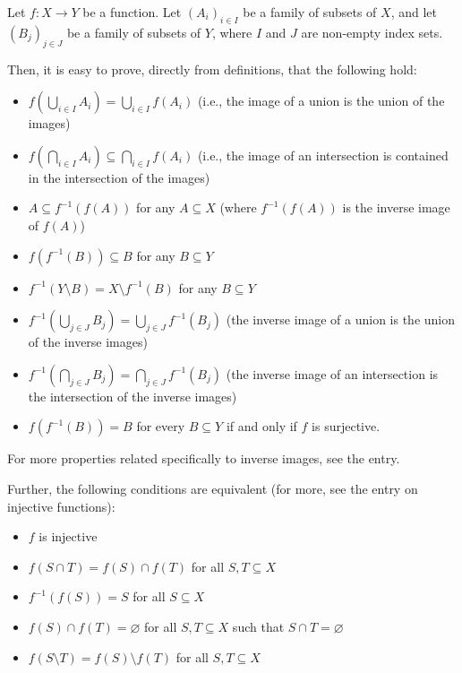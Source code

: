 \documentclass[12pt]{article}
\def\emptyset{\varnothing}
\begin{document}
Let $f \colon X \to Y$ be a function.
Let $(A_i)_{i \in I}$ be a family of subsets of $X$,
and let $(B_j)_{j \in J}$ be a family of subsets of $Y$,
where $I$ and $J$ are non-empty index sets.

Then, it is easy to prove, directly from definitions, that the following hold:

\begin{itemize}
\item $f(\bigcup \limits_{i \in I}{A_i}) = \bigcup \limits_{i \in I}{f(A_i)}$ (i.e., the image of a union is the union of the images)
\item $f(\bigcap \limits_{i \in I}{A_i}) \subseteq \bigcap \limits_{i \in I}{f(A_i)}$ (i.e., the image of an intersection is contained in the intersection of the images)
\item $A \subseteq f^{-1}(f(A))$ for any $A \subseteq X$ (where $f^{-1}(f(A))$ is the inverse image of $f(A)$)
\item $f(f^{-1}(B)) \subseteq B$ for any $B \subseteq Y$
\item $f^{-1}(Y \setminus B) = X \setminus f^{-1}(B)$ for any $B \subseteq Y$
\item $f^{-1}(\bigcup \limits_{j \in J}{B_j}) = \bigcup \limits_{j \in J}{f^{-1}(B_j)}$ (the inverse image of a union is the union of the inverse images)
\item $f^{-1}(\bigcap \limits_{j \in J}{B_j}) = \bigcap \limits_{j \in J}{f^{-1}(B_j)}$ (the inverse image of an intersection is the intersection of the inverse images)
\item $f(f^{-1}(B)) = B$ for every $B \subseteq Y$ if and only if $f$ is surjective.
\end{itemize}

For more properties related specifically to inverse images, see the  entry.

Further, the following conditions are equivalent (for more, see the entry on injective functions):
\begin{itemize}
\item $f$ is injective
\item $f(S \cap T) = f(S) \cap f(T)$ for all $S, T \subseteq X$
\item $f^{-1}(f(S)) = S$ for all $S \subseteq X$
\item $f(S) \cap f(T) = \emptyset$ for all $S,T \subseteq X$ such that $S \cap T = \emptyset$
\item $f(S \setminus T) = f(S) \setminus f(T)$ for all $S,T \subseteq X$
\end{itemize}
\end{document}
